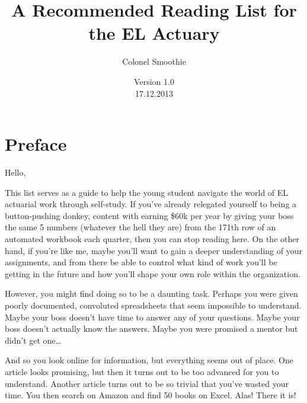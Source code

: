 \documentclass[oneside, titlepage]{article}
\begin{document}
\title{A Recommended Reading List for the EL Actuary}
\author{Colonel Smoothie}
\date{ Version 1.0\\ 17.12.2013}
\maketitle

\section*{Preface}

Hello,

This list serves as a guide to help the young student navigate the world of EL actuarial work through self-study. If you've already relegated yourself to being a button-pushing donkey, content with earning \$60k per year by giving your boss the same 5 numbers (whatever the hell they are) from the 171th row of an automated workbook each quarter, then you can stop reading here. On the other hand, if you're like me, maybe you'll want to gain a deeper understanding of your assignments, and from there be able to control what kind of work you'll be getting in the future and how you'll shape your own role within the organization.

However, you might find doing so to be a daunting task. Perhaps you were given poorly documented, convoluted spreadsheets that seem impossible to understand. Maybe your boss doesn't have time to answer any of your questions. Maybe your boss doesn't actually know the answers. Maybe you were promised a mentor but didn't get one\ldots

And so you look online for information, but everything seems out of place. One article looks promising, but then it turns out to be too advanced for you to understand. Another article turns out to be so trivial that you've wasted your time. You then search on Amazon and find 50 books on Excel. Alas! There it is! But then again, in what order do you read them? You don't have time to read 50 books, so which ones do you choose to read and which ones do you leave behind?

I've been there, and I know it can be frustrating to find the information you want and to organize your own curriculum for self study. Therefore, I've written this outline to make your lives a little easier. The following list is organized by subject, although you'll may have to skip from one subject to another depending on what you'll want to learn and what your boss wants you to learn. I've realized that just giving you a list of books doesn't tell you much about how to go about reading them, so at the end, I've provided a recommended ``reading order'' to help guide you. Anyway, here's the list - I hope this helps. If you have any questions, feel free to message me (Colonel Smoothie) on the AO.
\end{document}
